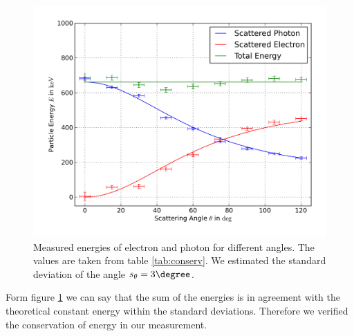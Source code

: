 \begin{figure}[h!]
  \centering
  \includegraphics[width=\textwidth]{plots/conservation.png}
  \caption{Measured energies of electron and photon for different angles. The values are taken from table \ref{tab:conserv}. We estimated the standard deviation
  of the angle $s_\theta = 3\degree$. }
  \label{fig:conserv}
\end{figure}

Form figure \ref{fig:conserv} we can say that the sum of the energies is in
agreement with the theoretical constant energy within the standard
deviations. Therefore we verified the conservation of energy in our
measurement. 
\label{sss:conserv}

\FloatBarrier
